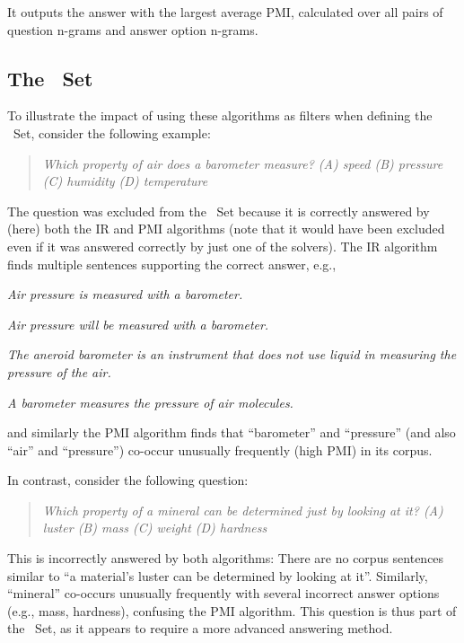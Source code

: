 It outputs the answer with the largest average PMI, calculated over all pairs of question n-grams and answer option n-grams.

\subsection{The \Challenge~Set}

To illustrate the impact of using these algorithms as filters when defining the \Challenge~Set, consider the following example:

\begin{quote}
{\it Which property of air does a barometer measure? (A) speed (B) pressure {\bfit [correct]} (C) humidity (D) temperature}
\end{quote}

The question was excluded from the \Challenge~Set because it is correctly answered by (here) both the IR and PMI algorithms (note that it would have been excluded even if it was answered correctly by just one of the solvers). The IR algorithm finds multiple sentences supporting the correct answer, e.g.,

\begin{ite}
\item {\it Air pressure is measured with a barometer.}
\item {\it Air pressure will be measured with a barometer.}
\item {\it The aneroid barometer is an instrument that does not use liquid in measuring the pressure of the air.}
\item {\it A barometer measures the pressure of air molecules.}
\end{ite}

and similarly the PMI algorithm finds that ``barometer'' and ``pressure'' (and also ``air'' and ``pressure'') co-occur unusually frequently (high PMI) in its corpus.

In contrast, consider the following question:

\begin{quote}
{\it Which property of a mineral can be determined just by looking at it? (A) luster {\bfit [correct]} (B) mass (C) weight (D) hardness}
\end{quote}

This is incorrectly answered by both algorithms: There are no corpus sentences similar to ``a material's luster can be determined by looking at it''. Similarly, ``mineral'' co-occurs unusually frequently with several incorrect answer options (e.g., mass, hardness), confusing the PMI algorithm. This question is thus part of the \Challenge~Set, as it appears to require a more advanced answering method.

